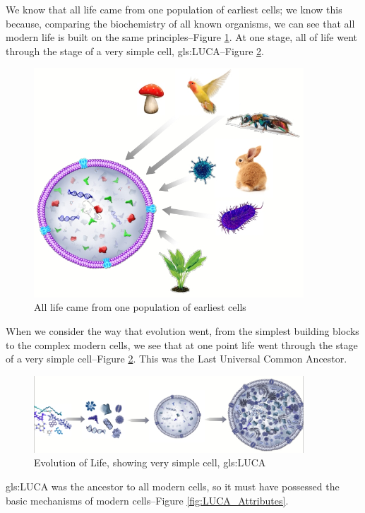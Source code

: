 \documentclass[]{article}
\begin{document}
We know that all life came from one population of earliest cells; we know this because, comparing the biochemistry of all known organisms, we can see that all modern life is built on the same principles--Figure \ref{fig:ModernCell}. At one stage, all of life went through the stage of a very simple cell, \gls{gls:LUCA}--Figure \ref{fig:EvolCell}.

\begin{figure}[H]
	\caption{All life came from one population of earliest cells}\label{fig:ModernCell}
	\includegraphics[width=0.9\textwidth]{ModernCell}
\end{figure}

When we consider the way that evolution went, from the simplest building blocks to the complex modern cells, we see that at one point life went through the stage of a very simple cell--Figure \ref{fig:EvolCell}. This was the Last Universal Common Ancestor.
	
\begin{figure}[H]
	\caption{Evolution of Life, showing very simple cell, \gls{gls:LUCA}}\label{fig:EvolCell}
	\includegraphics[width=0.9\textwidth]{EvolCell}
\end{figure}

\gls{gls:LUCA} was the ancestor to all modern cells, so it must have possessed the basic mechanisms of  modern cells--Figure \ref{fig:LUCA_Attributes}.
\end{document}
